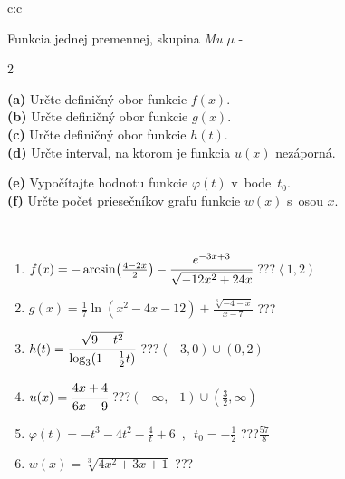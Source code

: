\documentclass[10pt]{report}
\begin{document}
\begin{tabular}{c:c}
\begin{minipage}[c][104.5mm][t]{0.5\linewidth}
\begin{center}
\vspace{7mm}
{\huge Funkcia jednej premennej, skupina \textit{Mu $\mu$} -}\\[5mm]
\begin{minipage}{0.95\linewidth}
\begin{center}
{\small \begin{multicols}{2} \raggedright
\textbf{(a)} Určte definičný obor funkcie \(f(x)\). \\[1mm]
\textbf{(b)} Určte definičný obor funkcie \(g(x)\). \\[1mm]
\textbf{(c)} Určte definičný obor funkcie \(h(t)\). \\[1mm]
\textbf{(d)} Určte interval, na ktorom je funkcia \(u(x)\) nezáporná. \par \columnbreak
\textbf{(e)} Vypočítajte hodnotu funkcie \(\varphi(t)\) v~bode~\(t_0\). \\[1mm]
\textbf{(f)} Určte počet priesečníkov grafu funkcie \(w(x)\) s~osou \(x\). \\[1mm]
\end{multicols}
}
\end{center}
\end{minipage}
\\[4mm]
\begin{minipage}{0.79\linewidth}
\begin{center}
\begin{varwidth}{\linewidth}
\begin{enumerate}
\small
\item $f(x) = -\arcsin\!\left( \frac{4-2x}{2} \right) - \cfrac{e^{-3x+3}}{\sqrt{-12x^2+24x}}$\quad \dotfill\; ???\;\dotfill \quad $\left\langle1 , 2\right)$
\item $g(x) = \frac{1}{7} \ln{\!(x^2-4x-12)}+\frac{\sqrt[3]{-4-x}}{x-7}$\quad \dotfill\; ???\;\dotfill {}
\item $h(t) = \cfrac{\sqrt{9-t^2}}{\log_3(1-\frac{1}{2}t)}$\quad \dotfill\; ???\;\dotfill \quad $\left\langle-3 , 0\right)\cup\left(0 , 2\right)$
\item $u(x) = \cfrac{4x+4}{6x-9}$\quad \dotfill\; ???\;\dotfill \quad $\left(-\infty , -1\right)\cup\left(\frac{3}{2} , \infty\right)$
\item $\varphi(t) = -t^3-4t^2-\frac{4}{t}+6 \enspace , \enspace t_0=-\frac{1}{2}$\quad \dotfill\; ???\;\dotfill \quad $\frac{57}{8}$
\item $w(x) = \sqrt[3]{4x^2+3x+1}$\quad \dotfill\; ???\;\dotfill {}

\end{enumerate}
\end{varwidth}
\end{center}
\end{minipage}
\end{center}
\end{minipage}
\end{tabular}
\end{document}
